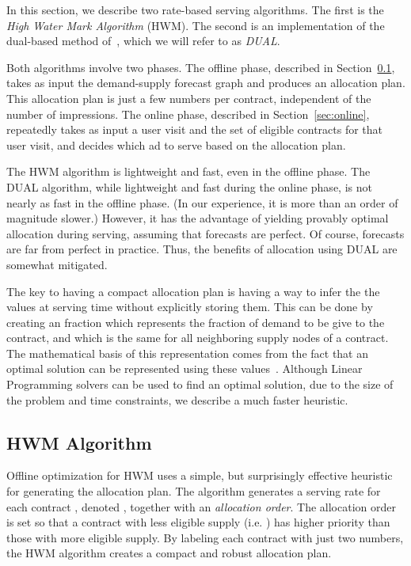 
In this section, we describe two rate-based serving algorithms.  The
first is the {\em High Water Mark Algorithm} (HWM).  The second is
an implementation of the dual-based method of~\cite{EC}, which we
will refer to as {\em DUAL}.

Both algorithms involve two phases. The offline phase, described in
Section~\ref{sec:offline}, takes as input the demand-supply forecast
graph and produces an allocation plan.  This allocation plan is just
a few numbers per contract, independent of the number of
impressions.
The online phase, described in
Section~\ref{sec:online}, repeatedly takes as input a user visit and
the set of eligible contracts for that user visit, and decides which
ad to serve based on the allocation plan.

The HWM algorithm is lightweight and fast, even in the offline
phase.  The DUAL algorithm, while lightweight and fast during the
online phase, is not nearly as fast in the offline phase.  (In our
experience, it is more than an order of magnitude slower.)  However,
it has the advantage of yielding provably optimal allocation during
serving, assuming that forecasts are perfect.  Of course, forecasts
are far from perfect in practice.  Thus, the benefits of allocation
using DUAL are somewhat mitigated.


The key to having a compact allocation plan is having a way to infer the the 
values at serving time without explicitly storing them.  This can be done by creating
an  fraction which represents the fraction of demand to be give to the contract,
and  which is the same for all neighboring supply nodes of a contract.  The mathematical basis
of this representation comes from the fact that an optimal solution can be represented
using these  values~\cite{EC}.  Although Linear Programming solvers can be
used to find an optimal solution, due to the size of the problem and time constraints,
we describe a much faster heuristic.

\subsection{HWM Algorithm}
\label{sec:offline} Offline optimization for HWM uses a simple, but
surprisingly effective heuristic for generating
the allocation plan.
The algorithm generates a serving rate for each contract , denoted , together with an
{\em allocation order}.  The allocation order is set so that a contract  with less eligible supply (i.e.
) has higher priority than those with more eligible supply.  By labeling each
contract with just two numbers, the HWM algorithm creates a compact and robust allocation plan.

